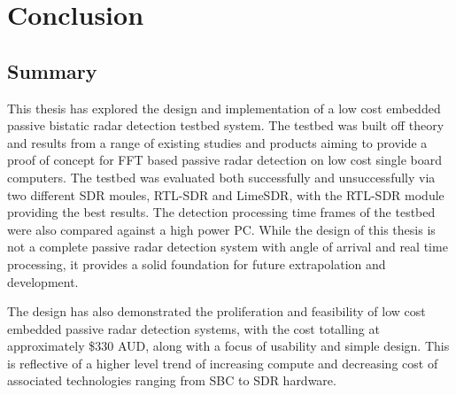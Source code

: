 \chapter{Conclusion \label{sec:conclusion}}


\section{Summary \label{sec:summary}}
This thesis has explored the design and implementation of a low cost embedded passive bistatic radar detection testbed system. The testbed was built off theory and results from a range of existing studies and products aiming to provide a proof of concept for FFT based passive radar detection on low cost single board computers. The testbed was evaluated both successfully and unsuccessfully via two different SDR moules, RTL-SDR and LimeSDR, with the RTL-SDR module providing the best results. The detection processing time frames of the testbed were also compared against a high power PC. While the design of this thesis is not a complete passive radar detection system with angle of arrival and real time processing, it provides a solid foundation for future extrapolation and development. 
\par \vspace{0.2cm}
The design has also demonstrated the proliferation and feasibility of low cost embedded passive radar detection systems, with the cost totalling at approximately \$330 AUD, along with a focus of usability and simple design. This is reflective of a higher level trend of increasing compute and decreasing cost of associated technologies ranging from SBC to SDR hardware. 

